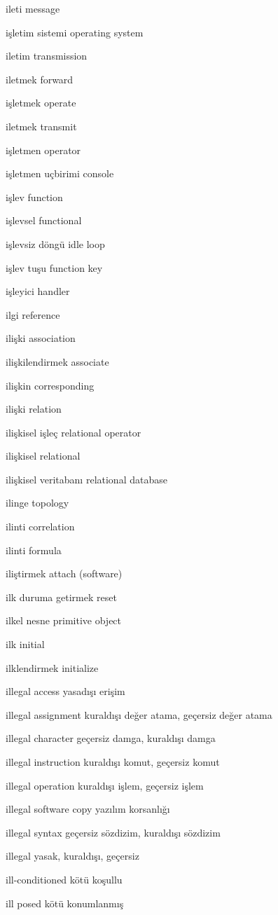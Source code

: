 \documentclass[12pt,fleqn]{article}\usepackage{../../common}
\begin{document}
ileti message

işletim sistemi operating system

iletim transmission

iletmek forward

işletmek operate

iletmek transmit

işletmen operator

işletmen uçbirimi console

işlev function

işlevsel functional

işlevsiz döngü idle loop

işlev tuşu function key

işleyici handler

ilgi reference

ilişki association

ilişkilendirmek associate

ilişkin corresponding

ilişki relation

ilişkisel işleç relational operator

ilişkisel relational

ilişkisel veritabanı relational database

ilinge topology

ilinti correlation

ilinti formula

iliştirmek attach (software)

ilk duruma getirmek reset

ilkel nesne primitive object

ilk initial

ilklendirmek initialize

illegal access yasadışı erişim

illegal assignment kuraldışı değer atama, geçersiz değer atama

illegal character geçersiz damga, kuraldışı damga

illegal instruction kuraldışı komut, geçersiz komut

illegal operation kuraldışı işlem, geçersiz işlem

illegal software copy yazılım korsanlığı

illegal syntax geçersiz sözdizim, kuraldışı sözdizim

illegal yasak, kuraldışı, geçersiz

ill-conditioned kötü koşullu

ill posed kötü konumlanmış
\end{document}
